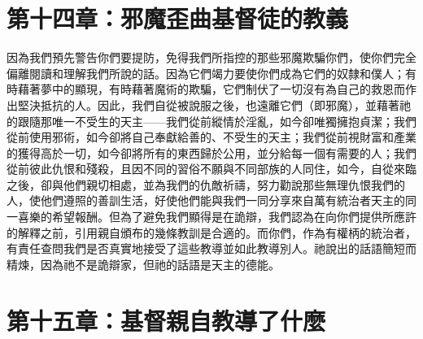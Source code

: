 
\section{第十四章：邪魔歪曲基督徒的教義}

因為我們預先警告你們要提防，免得我們所指控的那些邪魔欺騙你們，使你們完全偏離閱讀和理解我們所說的話。因為它們竭力要使你們成為它們的奴隸和僕人；有時藉著夢中的顯現，有時藉著魔術的欺騙，它們制伏了一切沒有為自己的救恩而作出堅決抵抗的人。因此，我們自從被說服之後，也遠離它們（即邪魔），並藉著祂的跟隨那唯一不受生的天主——我們從前縱情於淫亂，如今卻唯獨擁抱貞潔；我們從前使用邪術，如今卻將自己奉獻給善的、不受生的天主；我們從前視財富和產業的獲得高於一切，如今卻將所有的東西歸於公用，並分給每一個有需要的人；我們從前彼此仇恨和殘殺，且因不同的習俗不願與不同部族的人同住，如今，自從來臨之後，卻與他們親切相處，並為我們的仇敵祈禱，努力勸說那些無理仇恨我們的人，使他們遵照的善訓生活，好使他們能與我們一同分享來自萬有統治者天主的同一喜樂的希望報酬。但為了避免我們顯得是在詭辯，我們認為在向你們提供所應許的解釋之前，引用親自頒布的幾條教訓是合適的。而你們，作為有權柄的統治者，有責任查問我們是否真實地接受了這些教導並如此教導別人。祂說出的話語簡短而精煉，因為祂不是詭辯家，但祂的話語是天主的德能。\par


\section{第十五章：基督親自教導了什麼}

